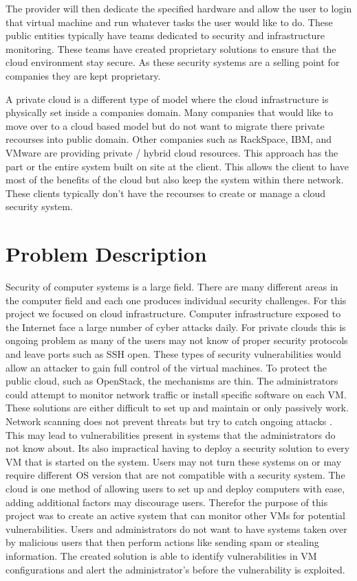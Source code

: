 \documentclass[12pt]{article}
\begin{document}
The provider will then dedicate the specified hardware and allow the user to login that virtual machine and run whatever tasks the user would like to do. These public entities typically have teams dedicated to security and infrastructure monitoring. These teams have created proprietary solutions to ensure that the cloud environment \cite{SecAmazon} stay secure. As these security systems are a selling point for companies they are kept proprietary. 

A private cloud is a different type of model where the cloud infrastructure is physically set inside a companies domain. Many companies that would like to move over to a cloud based model but do not want to migrate there private recourses into public domain. Other companies such as RackSpace, IBM, and VMware are providing private / hybrid cloud resources. This approach has the part or the entire system built on site at the client. This allows the client to have most of the benefits of the cloud but also keep the system within there network. These clients typically don't have the recourses to create or manage a cloud security system. 

\section{Problem Description}
Security of computer systems is a large field. There are many different areas in the computer field and each one produces individual security challenges. For this project we focused on cloud infrastructure. Computer infrastructure exposed to the Internet face a large number of cyber attacks daily\cite{cimpanu_2017}. For private clouds this is ongoing problem as many of the users may not know of proper security protocols and leave ports such as SSH open. These types of security vulnerabilities would allow an attacker to gain full control of the virtual machines. To protect the public cloud, such as OpenStack, the mechanisms are thin. The administrators could attempt to monitor network traffic or install specific software on each VM. These solutions are either difficult to set up and maintain or only passively work. Network scanning does not prevent threats but try to catch ongoing attacks \cite{global}. This may lead to vulnerabilities present in systems that the administrators do not know about. Its also impractical having to deploy a security solution to every VM that is started on the system. Users may not turn these systems on or may require different OS version that are not compatible with a security system. The cloud is one method of allowing users to set up and deploy computers with ease, adding additional factors may discourage users. Therefor the purpose of this project was to create an active system that can monitor other VMs for potential vulnerabilities. Users and administrators do not want to have systems taken over by malicious users that then perform actions like sending spam or stealing information. The created solution is able to identify vulnerabilities in VM configurations and alert the administrator's before the vulnerability is exploited. 
\end{document}
